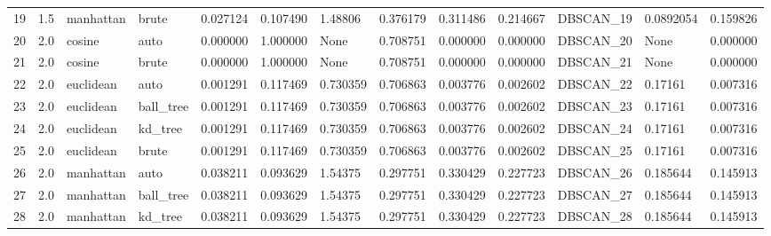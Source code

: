 \begin{tabular}{lrllrrlrrrllr}
19 &  1.5 &  manhattan &      brute &             0.027124 &            0.107490 &              1.48806 &               0.376179 &           0.311486 &           0.214667 &  DBSCAN\_19 &        0.0892054 &         0.159826 \\
20 &  2.0 &     cosine &       auto &             0.000000 &            1.000000 &                 None &               0.708751 &           0.000000 &           0.000000 &  DBSCAN\_20 &             None &         0.000000 \\
21 &  2.0 &     cosine &      brute &             0.000000 &            1.000000 &                 None &               0.708751 &           0.000000 &           0.000000 &  DBSCAN\_21 &             None &         0.000000 \\
22 &  2.0 &  euclidean &       auto &             0.001291 &            0.117469 &             0.730359 &               0.706863 &           0.003776 &           0.002602 &  DBSCAN\_22 &          0.17161 &         0.007316 \\
23 &  2.0 &  euclidean &  ball\_tree &             0.001291 &            0.117469 &             0.730359 &               0.706863 &           0.003776 &           0.002602 &  DBSCAN\_23 &          0.17161 &         0.007316 \\
24 &  2.0 &  euclidean &    kd\_tree &             0.001291 &            0.117469 &             0.730359 &               0.706863 &           0.003776 &           0.002602 &  DBSCAN\_24 &          0.17161 &         0.007316 \\
25 &  2.0 &  euclidean &      brute &             0.001291 &            0.117469 &             0.730359 &               0.706863 &           0.003776 &           0.002602 &  DBSCAN\_25 &          0.17161 &         0.007316 \\
26 &  2.0 &  manhattan &       auto &             0.038211 &            0.093629 &              1.54375 &               0.297751 &           0.330429 &           0.227723 &  DBSCAN\_26 &         0.185644 &         0.145913 \\
27 &  2.0 &  manhattan &  ball\_tree &             0.038211 &            0.093629 &              1.54375 &               0.297751 &           0.330429 &           0.227723 &  DBSCAN\_27 &         0.185644 &         0.145913 \\
28 &  2.0 &  manhattan &    kd\_tree &             0.038211 &            0.093629 &              1.54375 &               0.297751 &           0.330429 &           0.227723 &  DBSCAN\_28 &         0.185644 &         0.145913 \\

\end{tabular}
